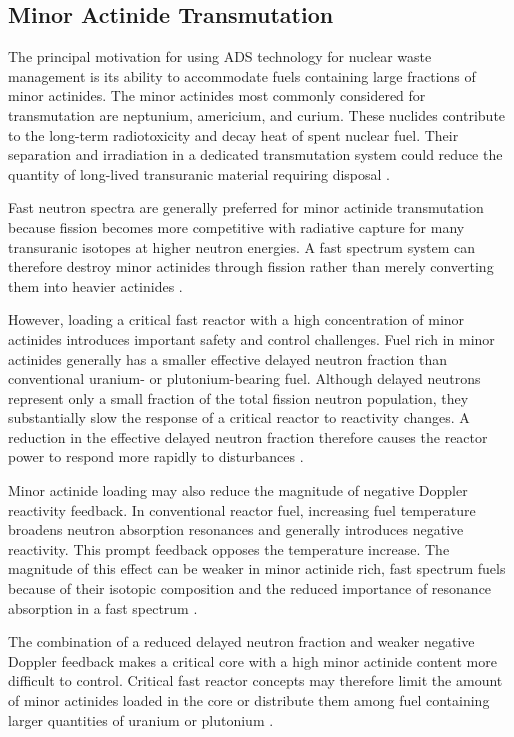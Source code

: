 \subsection{Minor Actinide Transmutation}
\label{subsec:ads-ma-transmutation}

The principal motivation for using \gls{ADS} technology for nuclear waste
management is its ability to accommodate fuels containing large fractions of
minor actinides. The minor actinides most commonly considered for
transmutation are neptunium, americium, and curium. These nuclides contribute
to the long-term radiotoxicity and decay heat of spent nuclear fuel. Their
separation and irradiation in a dedicated transmutation system could reduce
the quantity of long-lived transuranic material requiring disposal
\cite{iaea_ma_fuels_2009}.

Fast neutron spectra are generally preferred for minor actinide
transmutation because fission becomes more competitive with radiative
capture for many transuranic isotopes at higher neutron energies. A
fast spectrum system can therefore destroy minor actinides through fission
rather than merely converting them into heavier actinides
\cite{iaea_ma_fuels_2009}.

However, loading a critical fast reactor with a high concentration of minor
actinides introduces important safety and control challenges. Fuel rich in minor actinides
generally has a smaller effective delayed neutron fraction than
conventional uranium- or plutonium-bearing fuel. Although delayed neutrons
represent only a small fraction of the total fission neutron population, they
substantially slow the response of a critical reactor to reactivity changes.
A reduction in the effective delayed neutron fraction therefore causes the
reactor power to respond more rapidly to disturbances
\cite{eriksson_ads_safety_2004}.

Minor actinide loading may also reduce the magnitude of negative Doppler
reactivity feedback. In conventional reactor fuel, increasing fuel
temperature broadens neutron absorption resonances and generally introduces
negative reactivity. This prompt feedback opposes the temperature increase.
The magnitude of this effect can be weaker in minor actinide rich,
fast spectrum fuels because of their isotopic composition and the reduced
importance of resonance absorption in a fast spectrum
\cite{eriksson_ads_safety_2004,iaea_ma_fuels_2009}.

The combination of a reduced delayed neutron fraction and weaker negative
Doppler feedback makes a critical core with a high minor actinide content
more difficult to control. Critical fast reactor concepts may therefore limit
the amount of minor actinides loaded in the core or distribute them among
fuel containing larger quantities of uranium or plutonium \cite{eriksson_ads_safety_2004}.


